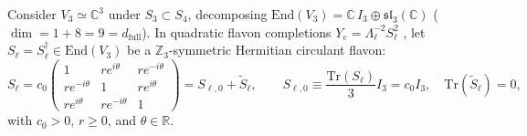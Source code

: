 \documentclass[11pt,a4paper]{article}
\begin{document}
Consider $V_3 \simeq \mathbb{C}^3$ under $S_3 \subset S_4$, decomposing $\mathrm{End}(V_3) = \mathbb{C}\,I_3 \oplus \mathfrak{sl}_3(\mathbb{C})$ ($\dim = 1 + 8 = 9 = d_{\mathrm{full}}$). In quadratic flavon completions $Y_e = \Lambda_\ell^{-2} S_\ell^2$ \cite{Koide1990,Sumino2009}, let $S_\ell = S_\ell^\dagger \in \mathrm{End}(V_3)$ be a $\mathbb{Z}_3$-symmetric Hermitian circulant flavon:
\begin{equation}
S_\ell = c_0 \begin{pmatrix}
1 & r e^{i\theta} & r e^{-i\theta} \\
r e^{-i\theta} & 1 & r e^{i\theta} \\
r e^{i\theta} & r e^{-i\theta} & 1
\end{pmatrix} = S_{\ell,0} + \tilde{S}_\ell, \qquad
S_{\ell,0} \equiv \frac{\mathrm{Tr}(S_\ell)}{3} I_3 = c_0 I_3, \quad \mathrm{Tr}(\tilde{S}_\ell) = 0,
\label{eq:circulant-flavon}
\end{equation}
with $c_0 > 0$, $r \ge 0$, and $\theta \in \mathbb{R}$.
\end{document}
